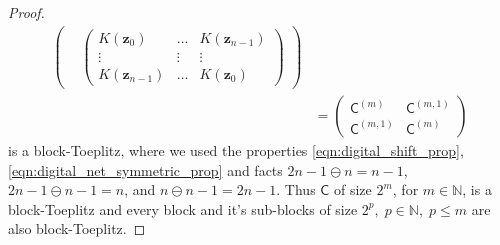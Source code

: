 \documentclass{iitthesis}          %
\newcommand{\bm}[1]{\boldsymbol{#1}}
\newcommand{\naturals}{\mathbb{N}}
\newcommand{\vz}{\bm{z}}
\newcommand{\mC}{\mathsf{C}}
\begin{document}
\begin{proof}
\begin{align*}
\begin{pmatrix}
&
\begin{pmatrix}
K(\vz_{  0   }) & \hdots & K(\vz_{ n-1}) \\
\vdots          & \vdots &    \vdots     \\
K(\vz_{ n-1  }) & \hdots & K(\vz_{ 0 })
\end{pmatrix}
\end{pmatrix} 
\\
& =
\begin{pmatrix}
\mC^{(m)} & \mC^{(m,1)} \\ \mC^{(m,1)} & \mC^{(m)}
\end{pmatrix}
\end{align*}
is a block-Toeplitz, where we used the properties  \ref{eqn:digital_shift_prop}, \ref{eqn:digital_net_symmetric_prop} and facts $2n-1 \ominus n = n-1$, $2n-1 \ominus n-1 = n$, and $n \ominus n-1 = 2n-1$.
Thus $\mC$ of size $2^m$, for $m \in \naturals$, is a block-Toeplitz and every block and it's sub-blocks of size $2^p, \; p \in \naturals, \; p \le m$ are also block-Toeplitz.
\end{proof}

\end{document}
